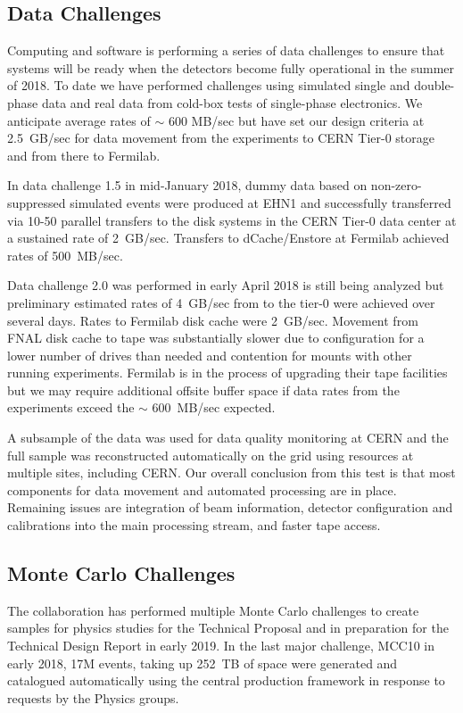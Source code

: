 \subsection{Data Challenges}

Computing and software is performing a series of data challenges to ensure that systems will be ready when the detectors become fully operational in the summer of 2018.  To date we have performed challenges using simulated single and double-phase data and real data from cold-box tests of single-phase electronics.   We anticipate average rates of $\sim$ 600 MB/sec but have set our design criteria at 2.5~GB/sec for data movement from the experiments to CERN Tier-0 storage and from there to Fermilab. 

In data challenge 1.5 in mid-January 2018, dummy data based on non-zero-suppressed simulated events were produced at EHN1 and successfully transferred via 10-50 parallel transfers to the  disk systems in the CERN Tier-0 data center at a sustained rate of 2~GB/sec.    Transfers to dCache/Enstore at Fermilab achieved rates of 500~MB/sec.  

Data challenge 2.0 was performed in early April 2018 is still being analyzed but preliminary estimated  rates of 4~GB/sec from  to the tier-0 were achieved over several days. Rates to Fermilab disk cache were 2~GB/sec.  Movement from FNAL disk cache to tape was substantially slower due to configuration for a lower number of drives than needed and contention for mounts with other running experiments.   Fermilab is in the process of upgrading their tape facilities but we may require additional offsite buffer space if data rates from the experiments exceed the $\sim$ 600~MB/sec expected. 

A subsample of the data was used for data quality monitoring at CERN and the full sample was reconstructed automatically on the grid using resources at multiple sites, including CERN. 
Our overall conclusion from this test is that most components for data movement and automated processing are in place.  Remaining issues are integration of beam information, detector configuration and calibrations into the main processing stream, and faster tape access. 

\subsection{Monte Carlo Challenges}
The collaboration has performed multiple Monte Carlo challenges to create samples for physics studies for the Technical Proposal and in preparation for the Technical Design Report in early 2019.  In the last major challenge,  MCC10 in early 2018, 17M events, taking up 252~TB of space were generated and catalogued automatically using the central  production framework in response to requests by the Physics groups. 

